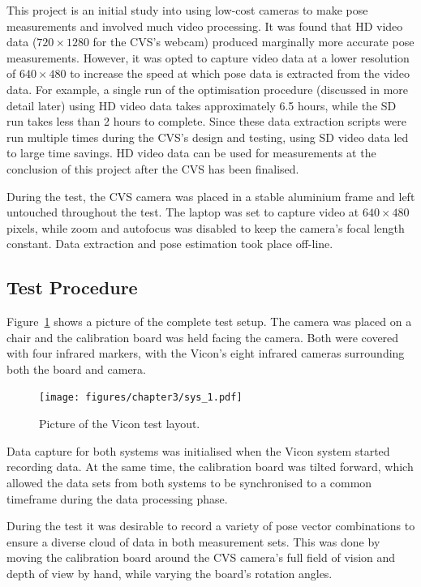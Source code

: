 This project is an initial study into using low-cost cameras to make pose measurements and involved much video processing. It was found that HD video data ($720\times1280$ for the CVS's webcam) produced marginally more accurate pose measurements. However, it was opted to capture video data at a lower resolution of $640\times480$ to increase the speed at which pose data is extracted from the video data. For example, a single run of the optimisation procedure (discussed in more detail later) using HD video data takes approximately 6.5 hours, while the SD run takes less than 2 hours to complete. Since these data extraction scripts were run multiple times during the CVS's design and testing, using SD video data led to large time savings. HD video data can be used for measurements at the conclusion of this project after the CVS has been finalised.  

During the test, the CVS camera was placed in a stable aluminium frame and left untouched throughout the test. The laptop was set to capture video at $640\times480$ pixels, while zoom and autofocus was disabled to keep the camera's focal length constant. Data extraction and pose estimation took place off-line. 

\subsection{Test Procedure}

Figure~\ref{fig:chap3-pic-sys-layout} shows a picture of the complete test setup. The camera was placed on a chair and the calibration board was held facing the camera. Both were covered with four infrared markers, with the Vicon's eight infrared cameras surrounding both the board and camera.  

\begin{figure}
  \centering
  \texttt{[image: figures/chapter3/sys\_1.pdf]}
  \caption{Picture of the Vicon test layout.}
\label{fig:chap3-pic-sys-layout}
\end{figure}

Data capture for both systems was initialised when the Vicon system started recording data. At the same time, the calibration board was tilted forward, which allowed the data sets from both systems to be synchronised to a common timeframe during the data processing phase. 

During the test it was desirable to record a variety of pose vector combinations to ensure a diverse cloud of data in both measurement sets. This was done by moving the calibration board around the CVS camera's full field of vision and depth of view by hand, while varying the board's rotation angles.  

